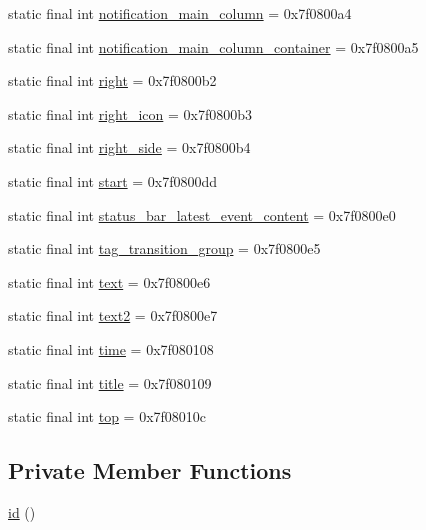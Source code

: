 \begin{DoxyCompactItemize}
static final int \mbox{\hyperlink{classandroid_1_1support_1_1v4_1_1_r_1_1id_ae504c70319d65564dd72127fddbeb0cf}{notification\+\_\+main\+\_\+column}} = 0x7f0800a4
\item 
static final int \mbox{\hyperlink{classandroid_1_1support_1_1v4_1_1_r_1_1id_a42b01419a5d5217de6c59e071e4bf055}{notification\+\_\+main\+\_\+column\+\_\+container}} = 0x7f0800a5
\item 
static final int \mbox{\hyperlink{classandroid_1_1support_1_1v4_1_1_r_1_1id_aa818423e6c0d8ea8151a94140abed4eb}{right}} = 0x7f0800b2
\item 
static final int \mbox{\hyperlink{classandroid_1_1support_1_1v4_1_1_r_1_1id_a00af98f22d1daea214d4bec44f26f5a0}{right\+\_\+icon}} = 0x7f0800b3
\item 
static final int \mbox{\hyperlink{classandroid_1_1support_1_1v4_1_1_r_1_1id_a8b25f7661ddb3333d9c1c0e566ff6116}{right\+\_\+side}} = 0x7f0800b4
\item 
static final int \mbox{\hyperlink{classandroid_1_1support_1_1v4_1_1_r_1_1id_a246c24fae5521e160e9306817a2bd3b1}{start}} = 0x7f0800dd
\item 
static final int \mbox{\hyperlink{classandroid_1_1support_1_1v4_1_1_r_1_1id_a229fca951cbfa57fc3abda27dc9de03a}{status\+\_\+bar\+\_\+latest\+\_\+event\+\_\+content}} = 0x7f0800e0
\item 
static final int \mbox{\hyperlink{classandroid_1_1support_1_1v4_1_1_r_1_1id_a117507d5d581a27ed95fe9d5537d6630}{tag\+\_\+transition\+\_\+group}} = 0x7f0800e5
\item 
static final int \mbox{\hyperlink{classandroid_1_1support_1_1v4_1_1_r_1_1id_a9849f260d54f8bed2873f6421aee7723}{text}} = 0x7f0800e6
\item 
static final int \mbox{\hyperlink{classandroid_1_1support_1_1v4_1_1_r_1_1id_aa02a7ff3fa383b21c5b845b18852ac3b}{text2}} = 0x7f0800e7
\item 
static final int \mbox{\hyperlink{classandroid_1_1support_1_1v4_1_1_r_1_1id_a30afcc3dcdbb2cea555117ae116b61a1}{time}} = 0x7f080108
\item 
static final int \mbox{\hyperlink{classandroid_1_1support_1_1v4_1_1_r_1_1id_a5c8aede2950c8a3ade737063d752bbda}{title}} = 0x7f080109
\item 
static final int \mbox{\hyperlink{classandroid_1_1support_1_1v4_1_1_r_1_1id_ac07fa206015ccb5a5bb0da6bbe642bc1}{top}} = 0x7f08010c
\end{DoxyCompactItemize}
\subsection*{Private Member Functions}
\begin{DoxyCompactItemize}
\item 
\mbox{\hyperlink{classandroid_1_1support_1_1v4_1_1_r_1_1id_a41674462355e6ba38d31dbbabe96adc1}{id}} ()
\end{DoxyCompactItemize}


